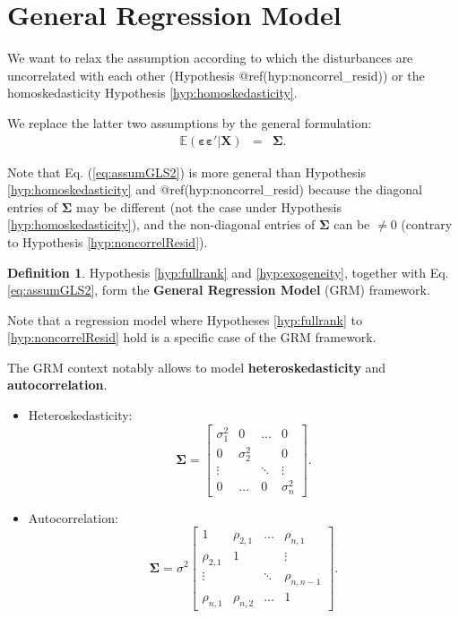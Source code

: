 \documentclass[
]{book}
\providecommand{\tightlist}{%
  \setlength{\itemsep}{0pt}\setlength{\parskip}{0pt}}
\theoremstyle{definition}
\newtheorem{definition}{Definition}[chapter]
\theoremstyle{definition}
\theoremstyle{definition}
\theoremstyle{definition}
\theoremstyle{remark}
\begin{document}
\hypertarget{general-regression-model}{%
\section{General Regression Model}\label{general-regression-model}}

We want to relax the assumption according to which the disturbances are uncorrelated with each other (Hypothesis @ref(hyp:noncorrel\_resid)) or the homoskedasticity Hypothesis \ref{hyp:homoskedasticity}.

We replace the latter two assumptions by the general formulation:
\begin{eqnarray}
\mathbb{E}(\boldsymbol\varepsilon \boldsymbol\varepsilon'| \mathbf{X}) &=& \boldsymbol\Sigma. \label{eq:assumGLS2}
\end{eqnarray}

Note that Eq. (\eqref{eq:assumGLS2}) is more general than Hypothesis \ref{hyp:homoskedasticity} and @ref(hyp:noncorrel\_resid) because the diagonal entries of \(\boldsymbol\Sigma\) may be different (not the case under Hypothesis \ref{hyp:homoskedasticity}), and the non-diagonal entries of \(\boldsymbol\Sigma\) can be \(\ne 0\) (contrary to Hypothesis \ref{hyp:noncorrelResid}).

\begin{definition}
\protect\hypertarget{def:GRM}{}\label{def:GRM}Hypothesis \ref{hyp:fullrank} and \ref{hyp:exogeneity}, together with Eq. \eqref{eq:assumGLS2}, form the \textbf{General Regression Model} (GRM) framework.
\end{definition}

Note that a regression model where Hypotheses \ref{hyp:fullrank} to \ref{hyp:noncorrelResid} hold is a specific case of the GRM framework.

The GRM context notably allows to model \textbf{heteroskedasticity} and \textbf{autocorrelation}.

\begin{itemize}
\tightlist
\item
  Heteroskedasticity:
  \begin{equation}
  \boldsymbol\Sigma = \left[  \begin{array}{cccc}
  \sigma_1^2 & 0 & \dots & 0 \\
  0 & \sigma_2^2 &  & 0 \\
  \vdots && \ddots& \vdots \\
  0 & \dots & 0 & \sigma_n^2
  \end{array} \right]. \label{eq:heteroskedasticity}
  \end{equation}
\item
  Autocorrelation:
  \begin{equation}
  \boldsymbol\Sigma = \sigma^2 \left[ \begin{array}{cccc}
  1 & \rho_{2,1} & \dots & \rho_{n,1} \\
  \rho_{2,1} & 1 &  & \vdots \\
  \vdots && \ddots& \rho_{n,n-1} \\
  \rho_{n,1} & \rho_{n,2} & \dots & 1
  \end{array} \right]. \label{eq:autocorrelation}
  \end{equation}
\end{itemize}
\end{document}
